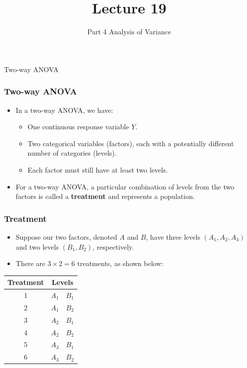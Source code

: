 \documentclass[12pt]{beamer}
\title[ECON2843]{Lecture 19}
\subtitle{Part 4 Analysis of Variance}
\date{}
\begin{document}
	\begin{frame}
		\titlepage
	\end{frame}
	\begin{frame}
		\vspace{1cm}
		\centering
		{\color{blue}\large Two-way ANOVA}
	\end{frame}
\begin{frame}
	\frametitle{Two-way ANOVA}
	
	\begin{itemize}[label={\color{blue}$\blacktriangleright$}]
		\item In a two-way ANOVA, we have:
		\begin{itemize}[label={\color{blue}$\blacktriangleright$}]
			\item One continuous response variable $Y$.
			\item Two categorical variables (factors), each with a potentially different number of categories (levels).
			\item Each factor must still have at least two levels.
		\end{itemize}
		\item For a two-way ANOVA, a particular combination of levels from the two factors is called a \textbf{treatment} and represents a population.
	\end{itemize}
	
\end{frame}
	\begin{frame}
		\frametitle{Treatment}
		
		\begin{itemize}[label={\color{blue}$\blacktriangleright$}]
			\item Suppose our two factors, denoted $A$ and $B$, have three levels $(A_1, A_2, A_3)$ and two levels $(B_1, B_2)$, respectively.
			\item There are $3 \times 2 = 6$ treatments, as shown below:
		\end{itemize}
		
		\vspace{0.5cm}
		
		\begin{center}
			\begin{tabular}{ccc}
				\toprule
				Treatment & \multicolumn{2}{c}{Levels} \\
				\midrule
				1 & $A_1$ & $B_1$ \\
				2 & $A_1$ & $B_2$ \\
				3 & $A_2$ & $B_1$ \\
				4 & $A_2$ & $B_2$ \\
				5 & $A_3$ & $B_1$ \\
				6 & $A_3$ & $B_2$ \\
				\bottomrule
			\end{tabular}
		\end{center}
		
	\end{frame}
\end{document}
